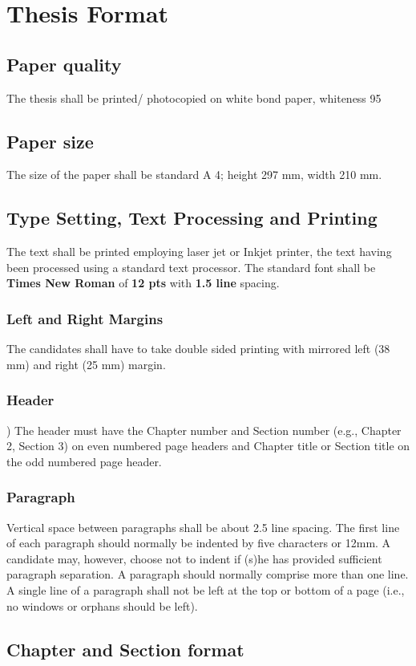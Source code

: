 \chapter{Thesis Format}
\section{Paper quality}
The thesis shall be printed/ photocopied on white bond paper, whiteness 95%
\section{Paper size}
The size of the paper shall be standard A 4; height 297 mm, width 210 mm.
\section{Type Setting, Text Processing and Printing}
The text shall be printed employing laser jet or Inkjet printer, the text having been processed using a standard text processor. The standard font shall be \textbf{Times New Roman} of \textbf{12 pts} with \textbf{1.5 line} spacing.
\subsection{Left and Right Margins}
The candidates shall have to take double sided printing with mirrored left (38 mm) and right (25 mm) margin.
\subsection{Header})
The header must have the Chapter number and Section number (e.g., Chapter 2, Section 3) on even numbered page headers and Chapter title or Section title on the odd numbered page header.
\subsection{Paragraph}
Vertical space between paragraphs shall be about 2.5 line spacing. The first line of each paragraph should normally be indented by five characters or 12mm. A candidate may, however, choose not to indent if (s)he has provided sufficient paragraph separation.
A paragraph should normally comprise more than one line. A single line of a paragraph shall not be left at the top or bottom of a page (i.e., no windows or orphans should be left).
\section{Chapter and Section format}
